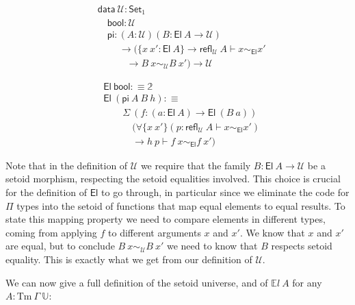 \documentclass{easychair}
\newcommand{\GG}{\Gamma}
\newcommand{\setoidU}{\mathcal{U}}
\newcommand{\Set}{\textsf{Set}}
\newcommand{\Tm}{\mathrm{Tm}}
\newcommand{\El}{\textsf{El}}
\newcommand{\Uty}{\mathds{U}}
\newcommand{\EL}{\mathds{E}l}
\newcommand{\reflu}{\textsf{refl}_\setoidU}
\newcommand{\equ}[2]{#1 \sim_\setoidU #2}
\newcommand{\eqel}[3]{#1 \vdash #2 \sim_\El #3}
\providecommand\mathbbm{\mathbb}
\begin{document}
\begin{minipage}{0.5\textwidth}
\begin{align*}
  & \textsf{data}\ \setoidU : \Set_1 \\
  & \quad \textsf{bool} : \setoidU \\
  & \quad \textsf{pi}
  :  (A : \setoidU) (B : \El\ A \to \setoidU)\\
  & \ \qquad \to (\{x\ x' : \El\ A\} \to \textsf{refl}_\setoidU\ A \vdash x \sim_\El x'\\
  & \qquad\quad \to B\ x \sim_\setoidU B\ x')
  \to \setoidU
\end{align*}
\end{minipage}
\begin{minipage}{0.5\textwidth}
\begin{align*}
  & \El\ \textsf{bool} :\equiv \mathbbm{2} \\
  & \El\ (\textsf{pi}\ A\ B\ h) :\equiv \\
  & \qquad \Sigma\ (f : (a : \El\ A) \to \El\ (B\ a)) \\
  & \qquad \quad
  (\forall\{x\ x'\}(p : \eqel{\reflu\ A}{x}{x'}) \\
  & \qquad \quad\to \eqel{h\ p}{f\ x}{f\ x'})
\end{align*}
\end{minipage}

Note that in the definition of $\setoidU$ we require that the family $B : \El\ A
\to \setoidU$ be a setoid morphism, respecting the setoid equalities involved.
%
This choice is crucial for the definition of $\El$ to go through, in particular
since we eliminate the code for $\Pi$ types into the setoid of functions that
map equal elements to equal results. To state this mapping property we need to
compare elements in different types, coming from applying $f$ to different
arguments $x$ and $x'$. We know that $x$ and $x'$ are equal, but to conclude
$\equ{B\ x}{B\ x'}$ we need to know that $B$ respects setoid equality. This is
exactly what we get from our definition of $\setoidU$.

We can now give a full definition of the setoid universe, and of $\EL\ A$ for
any $A : \Tm\ \GG\ \Uty$:
%
\end{document}
